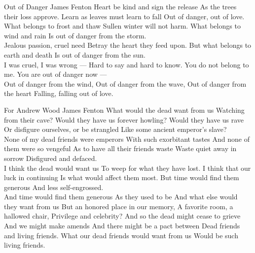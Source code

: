  \begin{poem}
{Out of Danger}
{James Fenton}
 Heart be kind and sign the release
 As the trees their loss approve.
 Learn as leaves must learn to fall
 Out of danger, out of love.\\
   
 What belongs to frost and thaw
 Sullen winter will not harm.
 What belongs to wind and rain
 Is out of danger from the storm.\\
   
 Jealous passion, cruel need
 Betray the heart they feed upon.
 But what belongs to earth and death
 Is out of danger from the sun.\\
   
 I was cruel, I was wrong ---
 Hard to say and hard to know.
 You do not belong to me.
 You are out of danger now ---\\
   
 Out of danger from the wind,
 Out of danger from the wave,
 Out of danger from the heart
 Falling, falling out of love.\\
 
\end{poem}
\begin{poem}
  {For Andrew Wood}
  {James Fenton}
What would the dead want from us
Watching from their cave?
Would they have us forever howling?
Would they have us rave
Or disfigure ourselves, or be strangled
Like some ancient emperor’s slave?\\

None of my dead friends were emperors
With such exorbitant tastes
And none of them were so vengeful
As to have all their friends waste
Waste quiet away in sorrow
Disfigured and defaced.\\

I think the dead would want us
To weep for what they have lost.
I think that our luck in continuing
Is what would affect them most.
But time would find them generous
And less self-engrossed.\\

And time would find them generous
As they used to be
And what else would they want from us
But an honored place in our memory,
A favorite room, a hallowed chair,
Privilege and celebrity?
And so the dead might cease to grieve
And we might make amends
And there might be a pact between
Dead friends and living friends.
What our dead friends would want from us
Would be such living friends.\\
\end{poem}
